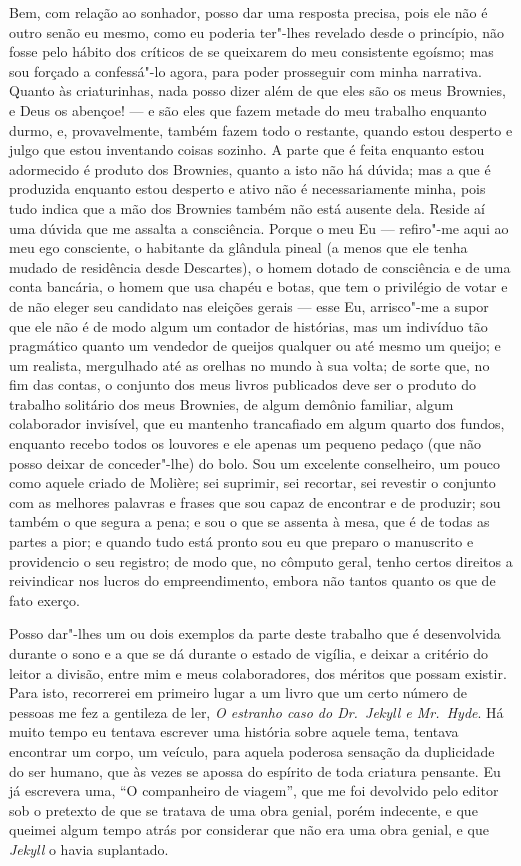 Bem, com relação ao sonhador, posso dar uma resposta precisa, pois ele
não é outro senão eu mesmo, como eu poderia ter"-lhes revelado desde o
princípio, não fosse pelo hábito dos críticos de se queixarem do meu
consistente egoísmo; mas sou forçado a confessá"-lo agora, para poder
prosseguir com minha narrativa.  Quanto às criaturinhas, nada posso
dizer além de que eles são os meus Brownies, e Deus os abençoe! --- e
são eles que fazem metade do meu trabalho enquanto durmo, e,
provavelmente, também fazem todo o restante, quando estou desperto e
julgo que estou inventando coisas sozinho.  A parte que é feita
enquanto estou adormecido é produto dos Brownies, quanto a isto não há
dúvida; mas a que é produzida enquanto estou desperto e ativo não é
necessariamente minha, pois tudo indica que a mão dos Brownies também
não está ausente dela.  Reside aí uma dúvida que me assalta a
consciência.  Porque o meu Eu --- refiro"-me aqui ao meu ego consciente, o
habitante da glândula pineal (a menos que ele tenha mudado de
residência desde Descartes), o homem dotado de consciência e de uma
conta bancária, o homem que usa chapéu e botas, que tem o privilégio de
votar e de não eleger seu candidato nas eleições gerais --- esse Eu,
arrisco"-me a supor que ele não é de modo algum um contador de
histórias, mas um indivíduo tão pragmático quanto um vendedor de
queijos qualquer ou até mesmo um queijo; e um realista, mergulhado até
as orelhas no mundo à sua volta; de sorte que, no fim das contas, o
conjunto dos meus livros publicados deve ser o produto do trabalho
solitário dos meus Brownies, de algum demônio familiar, algum
colaborador invisível, que eu mantenho trancafiado em algum quarto dos
fundos, enquanto recebo todos os louvores e ele apenas um pequeno
pedaço (que não posso deixar de conceder"-lhe) do bolo.  Sou um
excelente conselheiro, um pouco como aquele criado de Molière; sei
suprimir, sei recortar, sei revestir o conjunto com as melhores
palavras e frases que sou capaz de encontrar e de produzir; sou também
o que segura a pena; e sou o que se assenta à mesa, que é de todas as
partes a pior; e quando tudo está pronto sou eu que preparo o
manuscrito e providencio o seu registro; de modo que, no cômputo geral,
tenho certos direitos a reivindicar nos lucros do empreendimento,
embora não tantos quanto os que de fato exerço.

Posso dar"-lhes um ou dois exemplos da parte deste trabalho que é
desenvolvida durante o sono e a que se dá durante o estado de vigília,
e deixar a critério do leitor a divisão, entre mim e meus
colaboradores, dos méritos que possam existir.  Para isto, recorrerei
em primeiro lugar a um livro que um certo número de pessoas me fez a
gentileza de ler, \textit{O estranho caso do Dr.~Jekyll e Mr.~Hyde}. 
Há muito tempo eu tentava escrever uma história sobre aquele tema,
tentava encontrar um corpo, um veículo, para aquela poderosa sensação
da duplicidade do ser humano, que às vezes se apossa do espírito de
toda criatura pensante.  Eu já escrevera uma, ``O companheiro de
viagem'', que me foi devolvido pelo editor sob o pretexto de que se
tratava de uma obra genial, porém indecente, e que queimei algum tempo
atrás por considerar que não era uma obra genial, e que \textit{Jekyll} o havia
suplantado.

